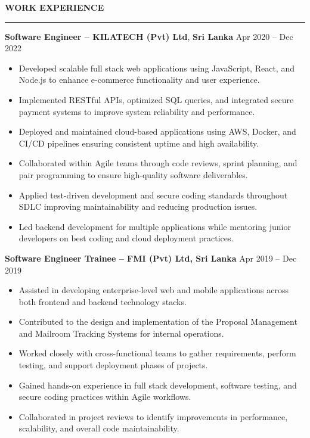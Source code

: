 \documentclass[10pt,letterpaper]{article}
\begin{document}
\vspace{8pt}

\textbf{WORK EXPERIENCE}\\[-8pt]
\noindent\rule{\textwidth}{1pt}

\vspace{-2pt}

\textbf{Software Engineer -- KILATECH (Pvt) Ltd}, \textbf{Sri Lanka} \hfill Apr 2020 -- Dec 2022

\vspace{-1pt}

\begin{itemize}
\item Developed scalable full stack web applications using JavaScript, React, and Node.js to enhance e-commerce functionality and user experience.
\item Implemented RESTful APIs, optimized SQL queries, and integrated secure payment systems to improve system reliability and performance.
\item Deployed and maintained cloud-based applications using AWS, Docker, and CI/CD pipelines ensuring consistent uptime and high availability.
\item Collaborated within Agile teams through code reviews, sprint planning, and pair programming to ensure high-quality software deliverables.
\item Applied test-driven development and secure coding standards throughout SDLC improving maintainability and reducing production issues.
\item Led backend development for multiple applications while mentoring junior developers on best coding and cloud deployment practices.
\end{itemize}

\textbf{Software Engineer Trainee -- FMI (Pvt) Ltd, Sri Lanka} \hfill Apr 2019 -- Dec 2019

\vspace{-1pt}

\begin{itemize}
\item Assisted in developing enterprise-level web and mobile applications across both frontend and backend technology stacks.
\item Contributed to the design and implementation of the Proposal Management and Mailroom Tracking Systems for internal operations.
\item Worked closely with cross-functional teams to gather requirements, perform testing, and support deployment phases of projects.
\item Gained hands-on experience in full stack development, software testing, and secure coding practices within Agile workflows.
\item Collaborated in project reviews to identify improvements in performance, scalability, and overall code maintainability.
\end{itemize}
\end{document}
